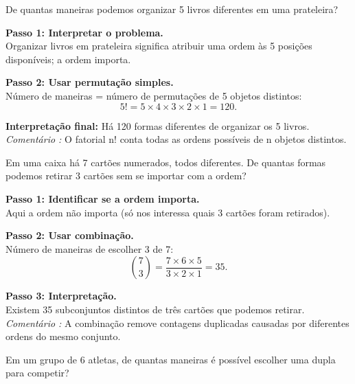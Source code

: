\documentclass[11pt]{article}
\begin{document}
\begin{tcolorbox}[title=\textbf{Questão 4}, colback=blue!6, colframe=blue!70!black]
De quantas maneiras podemos organizar 5 livros diferentes em uma prateleira?
\end{tcolorbox}

\begin{tcolorbox}[title=\textbf{Solução 4}, colback=green!6, colframe=green!60!black]
\textbf{Passo 1: Interpretar o problema.}\\
Organizar livros em prateleira significa atribuir uma ordem às 5 posições disponíveis; a ordem importa.

\textbf{Passo 2: Usar permutação simples.}\\
Número de maneiras = número de permutações de 5 objetos distintos:
\[
5! = 5 \times 4 \times 3 \times 2 \times 1 = 120.
\]

\textbf{Interpretação final:} Há 120 formas diferentes de organizar os 5 livros.\\
\emph{Comentário :} O fatorial n! conta todas as ordens possíveis de n objetos distintos.
\end{tcolorbox}


\begin{tcolorbox}[title=\textbf{Questão 5}, colback=blue!6, colframe=blue!70!black]
Em uma caixa há 7 cartões numerados, todos diferentes. De quantas formas podemos retirar 3 cartões sem se importar com a ordem?
\end{tcolorbox}

\begin{tcolorbox}[title=\textbf{Solução 5}, colback=green!6, colframe=green!60!black]
\textbf{Passo 1: Identificar se a ordem importa.}\\
Aqui a ordem não importa (só nos interessa quais 3 cartões foram retirados).

\textbf{Passo 2: Usar combinação.}\\
Número de maneiras de escolher 3 de 7:
\[
\binom{7}{3} = \frac{7 \times 6 \times 5}{3 \times 2 \times 1} = 35.
\]

\textbf{Passo 3: Interpretação.}\\
Existem 35 subconjuntos distintos de três cartões que podemos retirar.\\
\emph{Comentário :} A combinação remove contagens duplicadas causadas por diferentes ordens do mesmo conjunto.
\end{tcolorbox}


\begin{tcolorbox}[title=\textbf{Questão 6}, colback=blue!6, colframe=blue!70!black]
Em um grupo de 6 atletas, de quantas maneiras é possível escolher uma dupla para competir?
\end{tcolorbox}
\end{document}
